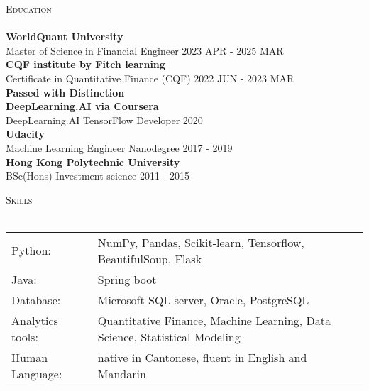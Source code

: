 \documentclass[a4paper]{article}
\newcommand{\lineunder} {
    \vspace*{-8pt} \\
    \hspace*{-18pt} \hrulefill \\
}
\newcommand{\header} [1] {
    {\hspace*{-18pt}\vspace*{6pt} \textsc{#1}}
    \vspace*{-6pt} \lineunder
}
\begin{document}
\header{Education}
\textbf{WorldQuant University}\\
Master of Science in Financial Engineer \hfill 2023 APR - 2025 MAR\\
\vspace{2mm}
\textbf{CQF institute by Fitch learning}\\
Certificate in Quantitative Finance (CQF) \hfill 2022 JUN - 2023 MAR\\
\textbf{Passed with Distinction}\\
\vspace{2mm}
\textbf{DeepLearning.AI via Coursera}\\
DeepLearning.AI TensorFlow Developer \hfill 2020\\
\vspace{2mm}
\textbf{Udacity}\\
Machine Learning Engineer Nanodegree \hfill 2017 - 2019\\
\vspace{2mm}
\textbf{Hong Kong Polytechnic University}\\
BSc(Hons) Investment science \hfill 2011 - 2015\\
\vspace{2mm}

\header{Skills}
\begin{tabular}{ l l }
	Python:          & NumPy, Pandas, Scikit-learn, Tensorflow, BeautifulSoup, Flask                        \\
	Java:            & Spring boot                                                                \\
	Database:        & Microsoft SQL server, Oracle, PostgreSQL                                   \\
	Analytics tools: & Quantitative Finance, Machine Learning, Data Science, Statistical Modeling \\
        Human Language:  & native in Cantonese, fluent in English and Mandarin
\end{tabular}
\vspace{2mm}





\ 
\end{document}
